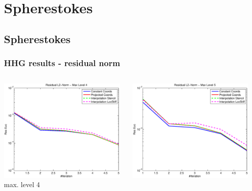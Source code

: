 \documentclass[t,compress=false,usepdftitle=false]{beamer}
\begin{document}
%
\section{Spherestokes}
\subsection{Spherestokes}
%
%
\begin{frame}\frametitle{HHG results - residual norm}

\begin{columns}[T] 
\begin{column}[T]{4.3cm} 
  \centering
  \includegraphics[width=0.98\textwidth]{spherestokes_resEuc_level4}\\
  max. level 4
\end{column}\hfill
\begin{column}[T]{4.3cm} 
  \centering
  \includegraphics[width=0.98\textwidth]{spherestokes_resEuc_level5}\\

\end{column}
\end{columns}
\end{frame}
\end{document}
